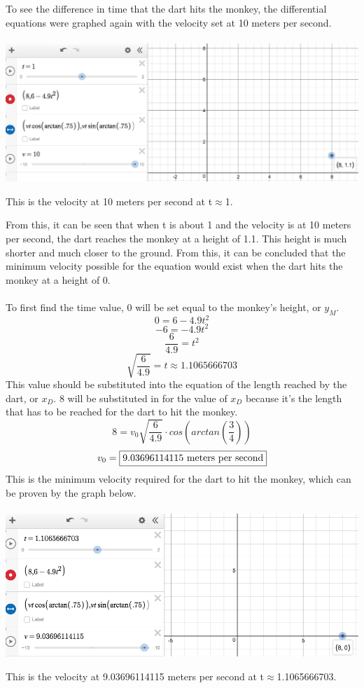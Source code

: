 \documentclass[12pt]{article}
\begin{document}
To see the difference in time that the dart hits the monkey, the differential equations were graphed again with the velocity set at 10 meters per second.\\\\
\includegraphics[scale=0.45]{picture3}
\begin{center}
    This is the velocity at 10 meters per second at t$\approx$1.
\end{center}
From this, it can be seen that when t is about 1 and the velocity is at 10 meters per second, the dart reaches the monkey at a height of 1.1. This height is much shorter and much closer to the ground. From this, it can be concluded that the minimum velocity possible for the equation would exist when the dart hits the monkey at a height of 0.\\\\
To first find the time value, 0 will be set equal to the monkey's height, or $y_M$.
$$0=6-4.9t^2$$
$$-6=-4.9t^2$$
$$\frac{6}{4.9}=t^2$$
$$\sqrt{\frac{6}{4.9}}=t\approx1.1065666703$$
This value should be substituted into the equation of the length reached by the dart, or $x_D$. 8 will be substituted in for the value of $x_D$ because it's the length that has to be reached for the dart to hit the monkey.
$$8=v_{0}\sqrt{\frac{6}{4.9}}\cdot cos(arctan(\frac{3}{4}))$$
$$v_{0}=\fbox{9.03696114115 meters per second}$$
This is the minimum velocity required for the dart to hit the monkey, which can be proven by the graph below.\\\\
\includegraphics[scale=0.48]{picture4}
\begin{center}
    This is the velocity at 9.03696114115 meters per second at t$\approx$1.1065666703.
\end{center}
\end{document}
